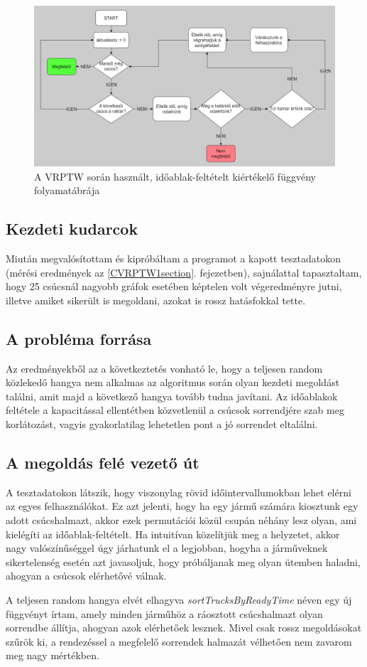 \begin{figure}[ht!]
	\centering
	\includegraphics[width=150mm, keepaspectratio]{figures/timeWindow.drawio.png}
	\caption{A VRPTW során használt, időablak-feltételt kiértékelő függvény folyamatábrája}
	\label{fig:VRPTW_chart}
\end{figure}

\subsection{Kezdeti kudarcok}
Miután megvalósítottam és kipróbáltam a programot a kapott tesztadatokon (mérési eredmények az \ref{CVRPTW1section}. fejezetben), sajnálattal tapasztaltam, hogy 25 csúcsnál nagyobb gráfok esetében képtelen volt végeredményre jutni, illetve amiket sikerült is megoldani, azokat is rossz hatásfokkal tette.

\subsection{A probléma forrása} Az eredményekből az a következtetés vonható le, hogy a teljesen random közlekedő hangya nem alkalmas az algoritmus során olyan kezdeti megoldást találni, amit majd a következő hangya tovább tudna javítani. Az időablakok feltétele a kapacitással ellentétben közvetlenül a csúcsok sorrendjére szab meg korlátozást, vagyis gyakorlatilag lehetetlen pont a jó sorrendet eltalálni. 

\subsection{A megoldás felé vezető út}
A tesztadatokon látszik, hogy viszonylag rövid időintervallumokban lehet elérni az egyes felhasználókat. Ez azt jelenti, hogy ha egy jármű számára kiosztunk egy adott csúcshalmazt, akkor ezek permutációi közül csupán néhány lesz olyan, ami kielégíti az időablak-feltételt. Ha intuitívan közelítjük meg a helyzetet, akkor nagy valószínűséggel úgy járhatunk el a legjobban, hogyha a járműveknek sikertelenség esetén azt javasoljuk, hogy próbáljanak meg olyan ütemben haladni, ahogyan a csúcsok elérhetővé válnak.

\noindent
A teljesen random hangya elvét elhagyva \textit{\mbox{sortTrucksByReadyTime}} néven egy új függvényt írtam, amely minden járműhöz a ráosztott csúcshalmazt olyan sorrendbe állítja, ahogyan azok elérhetőek lesznek. Mivel csak rossz megoldásokat szűrök ki, a rendezéssel a megfelelő sorrendek halmazát vélhetően nem zavarom meg nagy mértékben.
